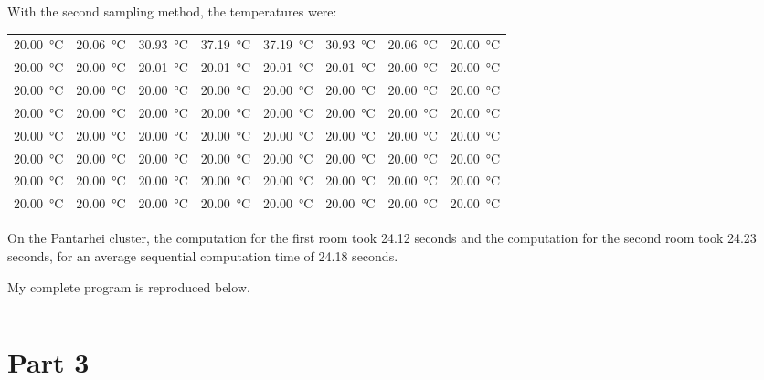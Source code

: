 \documentclass[12pt,letterpaper,oneside]{article}
\begin{document}
With the second sampling method, the temperatures were:
\begin{center}
	\footnotesize
	\begin{tabular}{r r r r r r r r}
		\SI{20.00}{\celsius} & \SI{20.06}{\celsius} & \SI{30.93}{\celsius} & \SI{37.19}{\celsius} & \SI{37.19}{\celsius} & \SI{30.93}{\celsius} & \SI{20.06}{\celsius} & \SI{20.00}{\celsius} \\
		\SI{20.00}{\celsius} & \SI{20.00}{\celsius} & \SI{20.01}{\celsius} & \SI{20.01}{\celsius} & \SI{20.01}{\celsius} & \SI{20.01}{\celsius} & \SI{20.00}{\celsius} & \SI{20.00}{\celsius}  \\
		\SI{20.00}{\celsius} & \SI{20.00}{\celsius} & \SI{20.00}{\celsius} & \SI{20.00}{\celsius} & \SI{20.00}{\celsius} & \SI{20.00}{\celsius} & \SI{20.00}{\celsius} & \SI{20.00}{\celsius} \\
		\SI{20.00}{\celsius} & \SI{20.00}{\celsius} & \SI{20.00}{\celsius} & \SI{20.00}{\celsius} & \SI{20.00}{\celsius} & \SI{20.00}{\celsius} & \SI{20.00}{\celsius} & \SI{20.00}{\celsius} \\
		\SI{20.00}{\celsius} & \SI{20.00}{\celsius} & \SI{20.00}{\celsius} & \SI{20.00}{\celsius} & \SI{20.00}{\celsius} & \SI{20.00}{\celsius} & \SI{20.00}{\celsius} & \SI{20.00}{\celsius} \\
		\SI{20.00}{\celsius} & \SI{20.00}{\celsius} & \SI{20.00}{\celsius} & \SI{20.00}{\celsius} & \SI{20.00}{\celsius} & \SI{20.00}{\celsius} & \SI{20.00}{\celsius} & \SI{20.00}{\celsius} \\
		\SI{20.00}{\celsius} & \SI{20.00}{\celsius} & \SI{20.00}{\celsius} & \SI{20.00}{\celsius} & \SI{20.00}{\celsius} & \SI{20.00}{\celsius} & \SI{20.00}{\celsius} & \SI{20.00}{\celsius} \\
		\SI{20.00}{\celsius} & \SI{20.00}{\celsius} & \SI{20.00}{\celsius} & \SI{20.00}{\celsius} & \SI{20.00}{\celsius} & \SI{20.00}{\celsius} & \SI{20.00}{\celsius} & \SI{20.00}{\celsius}
	\end{tabular}
	\normalsize
\end{center}

On the Pantarhei cluster, the computation for the first room took 24.12 seconds and the computation for the second room took 24.23 seconds, for an average sequential computation time of 24.18 seconds.

My complete program is reproduced below.
\inputminted[tabsize=2,fontsize=\small]{c}{part2.c}

\section*{Part 3}
\end{document}
